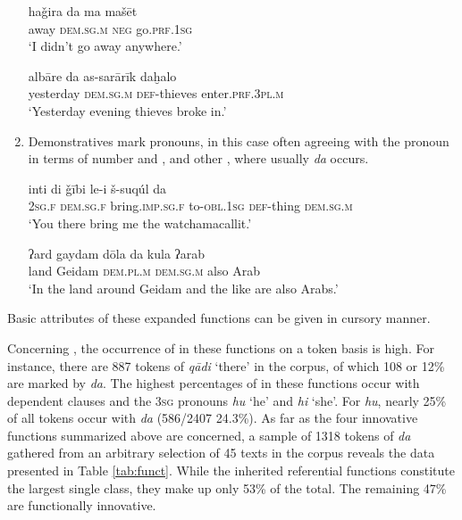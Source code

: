 \documentclass[output=paper]{langsci/langscibook}
\begin{document}
\begin{enumerate}[leftmargin=*]
\ea\label{hajira}
\gll haǧira da ma mašēt\\
     away \textsc{dem.sg.m} \textsc{neg} go.\textsc{prf.1sg}\\
\glt ‘I didn’t go away anywhere.’
\z

\ea\label{albare}
\gll albāre da as-sarārīk daḫalo\\
     yesterday \textsc{dem.sg.m} \textsc{def-}thieves enter.\textsc{prf.3pl.m}\\
\glt ‘Yesterday evening thieves broke in.’
\z

\item Demonstratives mark pronouns, in this case often agreeing with the pronoun in terms of number and , and other , where usually \textit{da} occurs.

\ea\label{suqul}
\ea
\gll inti di ǧībi le-i š-suqúl da\\
     \textsc{2sg.f} \textsc{dem.sg.f} bring.\textsc{imp.sg.f} to-\textsc{obl.1sg} \textsc{def-}thing \textsc{dem.sg.m}\\
\glt ‘You there bring me the watchamacallit.’
\z

\ea\label{ard}
\gll ʔard gaydam dōla da kula ʔarab\\
     land Geidam \textsc{dem.pl.m} \textsc{dem.sg.m} also Arab\\
\glt ‘In the land around Geidam and the like are also Arabs.’
\z
\z

\end{enumerate}

\noindent Basic attributes of these expanded functions can be given in cursory manner.

Concerning , the occurrence of  in these functions on a token basis is high. For instance, there are 887 tokens of \textit{qādi} ‘there’ in the corpus, of which 108 or 12\% are marked by \textit{da}. The highest percentages of  in these functions occur with dependent clauses and the 3\textsc{sg} pronouns \textit{hu} ‘he’ and \textit{hi} ‘she’. For \textit{hu}, nearly 25\% of all tokens occur with \textit{da} (586/2407 24.3\%). As far as the four innovative functions summarized above are concerned, a sample of 1318 tokens of \textit{da} gathered from an arbitrary selection of 45 texts in the corpus reveals the data presented in Table \ref{tab:funct}. While the inherited referential functions constitute the largest single class, they make up only 53\% of the total. The remaining 47\% are functionally innovative.
\end{document}
